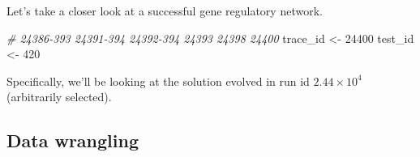 \documentclass[
]{book}
\newenvironment{Shaded}{\begin{snugshade}}{\end{snugshade}}
\newcommand{\CommentTok}[1]{\textcolor[rgb]{0.56,0.35,0.01}{\textit{#1}}}
\newcommand{\DecValTok}[1]{\textcolor[rgb]{0.00,0.00,0.81}{#1}}
\newcommand{\NormalTok}[1]{#1}
\newcommand{\StringTok}[1]{\textcolor[rgb]{0.31,0.60,0.02}{#1}}
\begin{document}
Let's take a closer look at a successful gene regulatory network.

\begin{Shaded}
\begin{Highlighting}[]
\CommentTok{\# 24386{-}393 24391{-}394 24392{-}394 24393 24398 24400}
\NormalTok{trace\_id \textless{}{-}}\StringTok{ }\DecValTok{24400}
\NormalTok{test\_id \textless{}{-}}\StringTok{ }\DecValTok{420}
\end{Highlighting}
\end{Shaded}

Specifically, we'll be looking at the solution evolved in run id \ensuremath{2.44\times 10^{4}} (arbitrarily selected).

\hypertarget{data-wrangling-1}{%
\subsection{Data wrangling}\label{data-wrangling-1}}
\end{document}
